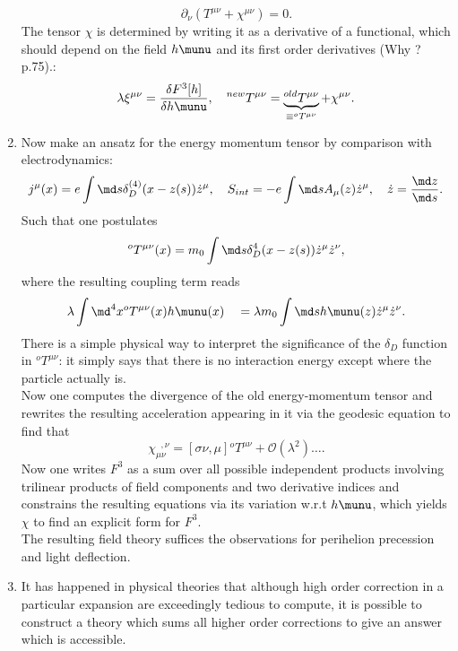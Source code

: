 \begin{enumerate}
\begin{equation}
\partial_\nu (T^{\mu \nu} + \chi^{\mu \nu}) = 0.
\end{equation}
The tensor $\chi$ is determined by writing it as a derivative of a functional, which should depend on the field $h\munu$ and its first order derivatives (Why ? p.75).:
\begin{equation}
\lambda \xi^{\mu \nu} = \frac{\delta F^3 [h]}{\delta h\munu},\quad ^{new}T^{\mu \nu} = \underbrace{^{old}T^{\mu \nu}}_{\equiv ^oT^{\mu \nu}} + \chi^{\mu \nu}.
\end{equation}
\item Now make an ansatz for the energy momentum tensor by comparison with electrodynamics:
\begin{equation}
	j^{\mu} (x) = e \int \md s \delta^{(4)}_D(x-z(s)) \dot{z}^\mu, \quad S_{int} = -e \int \md s A_\mu (z) \dot{z}^\mu, \quad \dot{z} = \frac{\md z}{\md s}.
\end{equation}
Such that one postulates
\begin{equation}
	^oT^{\mu \nu} (x) = m_0 \int \md s \delta^4_D(x-z(s)) \dot{z}^\mu  \dot{z}^\nu,
\end{equation}
where the resulting coupling term reads
\begin{equation}
	\lambda \int \md^4x ^oT^{\mu \nu}(x) h\munu (x) \quad = \lambda m_0 \int \md s h\munu (z) \dot{z}^\mu \dot{z}^\nu.
\end{equation}
There is a simple physical way to interpret the significance of the $\delta_D$ function in $^oT^{\mu \nu}$: it simply says that there is no interaction energy except where the particle actually is.\\
Now one computes the divergence of the old energy-momentum tensor and rewrites the resulting acceleration appearing in it via the geodesic equation to find that
\begin{equation}
	\chi^{\;\; ,\nu}_{\mu \nu}= [\sigma \nu, \mu] {}^o T^{\mu \nu} + \mathcal{O}(\lambda^2) \dots.
	\end{equation}
Now one writes $F^3$ as a sum over all possible independent products involving trilinear products of field components and two derivative indices and constrains the resulting equations via its variation w.r.t $h\munu$, which yields $\chi$ to find an explicit form for $F^3$.\\
The resulting field theory suffices the observations for perihelion precession and light deflection.
\item It has happened in physical theories that although high order correction in a particular expansion are exceedingly tedious to compute, it is possible to construct a theory which sums all higher order corrections to give an answer which is accessible. \\

\end{enumerate}
